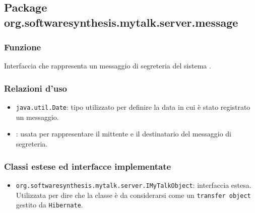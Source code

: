 \subsection{Package org.softwaresynthesis.mytalk.server.message}\label{sec:message}


\subsubsection*{Funzione}
Interfaccia che rappresenta un messaggio di segreteria del sistema \caName.

\subsubsection*{Relazioni d'uso}
\begin{itemize}
	\item \texttt{java.util.Date}: tipo utilizzato per definire la data in cui è stato registrato un messaggio.
	\item {}: usata per rappresentare il mittente e il destinatario del messaggio di segreteria.
\end{itemize}

\subsubsection*{Classi estese ed interfacce implementate}

\begin{itemize}
	\item \texttt{org.softwaresynthesis.mytalk.server.IMyTalkObject}: interfaccia estesa. Utilizzata per dire che la classe è da considerarsi come un \texttt{transfer object} gestito da \texttt{Hibernate}.
\end{itemize}

